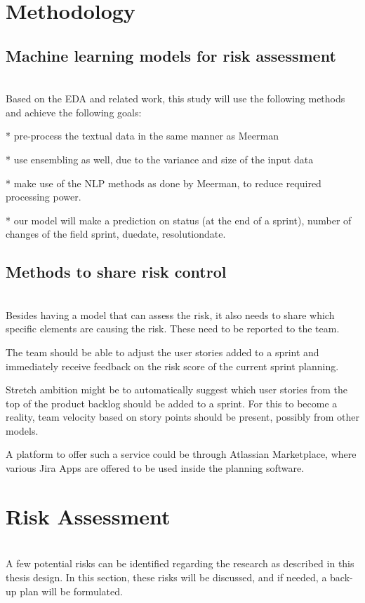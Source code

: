 \documentclass[sigconf]{acmart}
\begin{document}
\section{Methodology}

\subsection{Machine learning models for risk assessment}\\
Based on the EDA and related work, this study will use the following methods and achieve the following goals:

* pre-process the textual data in the same manner as Meerman 

* use ensembling as well, due to the variance and size of the input data

* make use of the NLP methods as done by Meerman, to reduce required processing power.

* our model will make a prediction on status (at the end of a sprint), number of changes of the field sprint, duedate, resolutiondate.

\subsection{Methods to share risk control}\\
Besides having a model that can assess the risk, it also needs to share which specific elements are causing the risk. These need to be reported to the team.

The team should be able to adjust the user stories added to a sprint and immediately receive feedback on the risk score of the current sprint planning.

Stretch ambition might be to automatically suggest which user stories from the top of the product backlog should be added to a sprint. For this to become a reality, team velocity based on story points should be present, possibly from other models.

A platform to offer such a service could be through Atlassian Marketplace, where various Jira Apps are offered to be used inside the planning software.


\section{Risk Assessment}\\
A few potential risks can be identified regarding the research as described in this thesis design. In this section, these risks will be discussed, and if needed, a back-up plan will be formulated.
\end{document}
